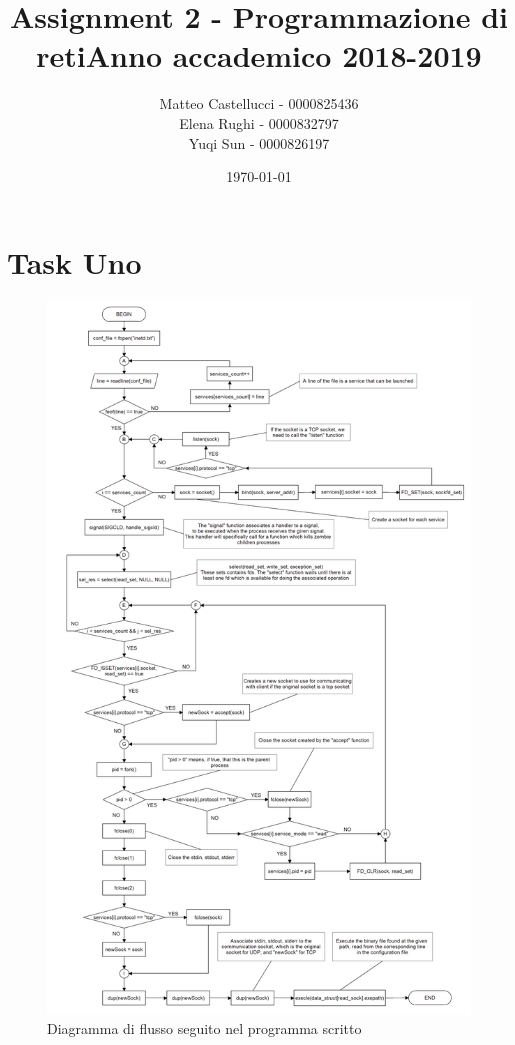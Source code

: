 \documentclass[a4paper, 12pt]{report}
\title{Assignment 2 - Programmazione di reti\newline Anno accademico 2018-2019}
\date{\today}
\author{Matteo Castellucci - 0000825436\\Elena Rughi - 0000832797\\Yuqi Sun - 0000826197\newline}
\begin{document}
\maketitle
\tableofcontents

\chapter{Task Uno}

\newpage

\begin{figure}[H]
	\centering
	\includegraphics[width=\textwidth,height=\textheight,keepaspectratio]{images/diagram.png}
	\caption{Diagramma di flusso seguito nel programma scritto}
\end{figure}
\end{document}
